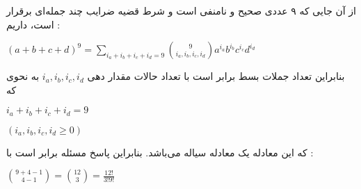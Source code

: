 \p
از آن جایی که ۹ عددی صحیح و نا‌منفی است و شرط قضیه ضرایب چند جمله‌ای برقرار است، داریم :
\begin{center}
  $(a + b + c + d)^9 = \sum\limits_{i_a+i_b+i_c+i_d=9} \binom{9}{i_a,i_b,i_c,i_d} a^{i_a} b^{i_b} c^{i_c} d^{i_d}$
\end{center}
بنابراین تعداد جملات بسط برابر است با تعداد حالات مقدار دهی
$i_a,i_b,i_c,i_d$
به نحوی که
\begin{center}
  $i_a+i_b+i_c+i_d=9$
  
  $(i_a,i_b,i_c,i_d \geq 0)$
\end{center}
که این معادله یک معادله سیاله می‌باشد. بنابراین پاسخ مسئله برابر است با :
\begin{center}
  $\binom{9 + 4 - 1}{4 - 1} = \binom{12}{3} = \frac{12!}{3!9!}$
\end{center}  
